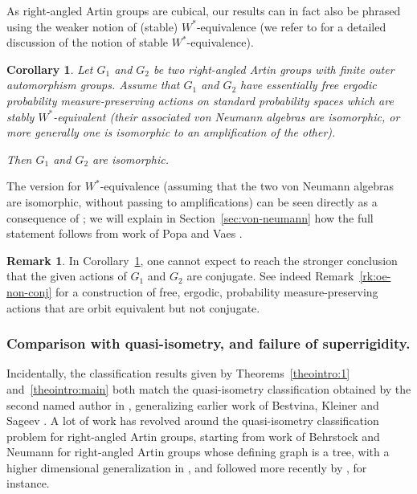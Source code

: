 \documentclass[JEP,XML,SOM,Unicode,NoFloatCountersInSection,published]{cedram}
\theoremstyle{plain}
\newtheorem{corintro}[theointro]{Corollary}
\theoremstyle{definition}
\newtheorem*{rk*}{Remark}
\begin{document}
As right-angled Artin groups are cubical, our results can in fact also be phrased using the weaker notion of (stable) $W^*$-equivalence (we refer to \cite[\S 6.2]{PV} for a detailed discussion of the notion of stable $W^*$-equivalence).

\begin{corintro}\label{corintro:von-neumann}
Let $G_1$ and $G_2$ be two right-angled Artin groups with finite outer automorphism groups. Assume that $G_1$ and $G_2$ have essentially free ergodic probability measure-preserving actions on standard probability spaces which are stably $W^*$\nobreakdash-equi\-valent (\ie their associated von Neumann algebras are isomorphic, or more generally one is isomorphic to an amplification of the other).

Then $G_1$ and $G_2$ are isomorphic.
\end{corintro}

The version for $W^*$-equivalence (\ie assuming that the two von Neumann algebras are isomorphic, without passing to amplifications) can be seen directly as a consequence of \cite[Cor.\,4.2]{HHL}; we will explain in Section~\ref{sec:von-neumann} how the full statement follows from work of Popa and Vaes \cite{PV1}.

\begin{rk*}
In Corollary~\ref{corintro:von-neumann}, one cannot expect to reach the stronger conclusion that the given actions of $G_1$ and $G_2$ are conjugate. See indeed Remark~\ref{rk:oe-non-conj} for a construction of free, ergodic, probability measure-preserving actions that are orbit equivalent but not conjugate.
\end{rk*}

\subsubsection*{Comparison with quasi-isometry, and failure of superrigidity.} Incidentally, the classification results given by Theorems~\ref{theointro:1} and~\ref{theointro:main} both match the quasi-isometry classification obtained by the second named author in \cite{Hua}, generalizing earlier work of Bestvina, Kleiner and Sageev \cite{BKS}. A lot of work has revolved around the quasi-isometry classification problem for right-angled Artin groups, starting from work of Behrstock and Neumann \cite{behrstock2008quasi} for right-angled Artin groups whose defining graph is a tree, with a higher dimensional generalization in \cite{behrstock2010quasi}, and followed more recently by \cite{Hua4,Mar}, for instance.
\end{document}
